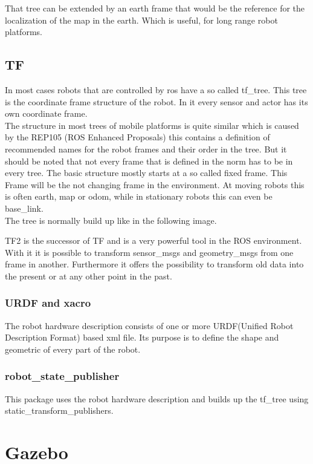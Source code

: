 	That tree can be extended by an earth frame that would be the reference for the localization of the map in the earth. Which is useful, for long range robot platforms.\cite{REP105}
	
	
	
\subsection{TF}
In most cases robots that are controlled by ros have a so called tf\_tree. This tree is the coordinate frame structure of the robot. In it every sensor and actor has its own coordinate frame.\\
 The structure in most trees of mobile platforms is quite similar which is caused by the REP105 (ROS Enhanced Proposals) this contains a definition of recommended names for the robot frames and their order in the tree. But it should be noted that not every frame that is defined in the norm has to be in every tree. The basic structure mostly starts at a so called fixed frame. This Frame will be the not changing frame in the environment. At moving robots this is often earth, map or odom, while in stationary robots this can even be base\_link.\\
 

The tree is normally build up like in the following image. 

TF2 is the successor of TF and is a very powerful tool in the ROS environment. With it it is possible to transform sensor\_msgs and geometry\_msgs from one frame in another. Furthermore it offers the possibility to transform old data into the present or at any other point in the past.

\subsubsection{URDF and xacro}
The robot hardware description consists of one or more URDF(Unified Robot Description Format) based xml file. Its purpose is to define the shape and geometric of every part of the robot. 

\subsubsection{robot\_state\_publisher}
	This package uses the robot hardware description and builds up the tf\_tree using static\_transform\_publishers.

\section{Gazebo}


